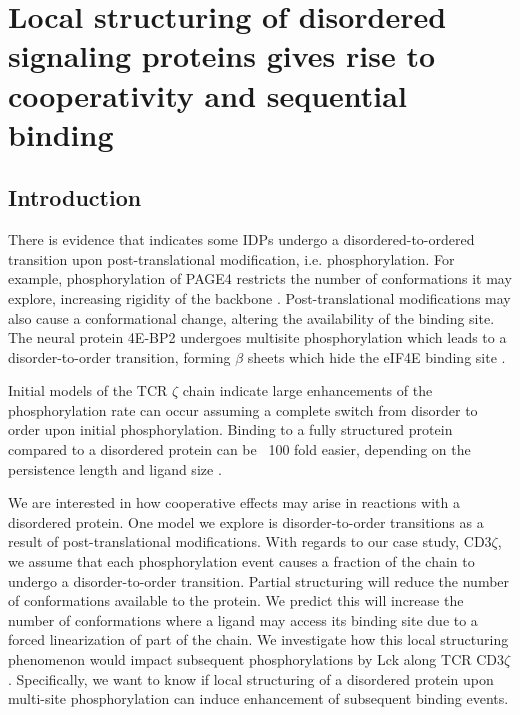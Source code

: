 \documentclass[../../AdvancementSummary.tex]{subfiles}
\begin{document}
\section{Local structuring of disordered signaling proteins gives rise to cooperativity and sequential binding}
\label{sec:LocalStruct}


\subsection{Introduction}


There is evidence that indicates some IDPs undergo a disordered-to-ordered transition upon post-translational modification, i.e. phosphorylation. For example, phosphorylation of PAGE4 restricts the number of conformations it may explore, increasing rigidity of the backbone \cite{He2015}. Post-translational modifications may also cause a conformational change, altering the availability of the binding site. The neural protein 4E-BP2 undergoes multisite phosphorylation which leads to a disorder-to-order transition, forming $\beta$ sheets which hide the eIF4E binding site \cite{Bah2015}. 

Initial models of the TCR $\zeta$ chain indicate large enhancements of the phosphorylation rate can occur assuming a complete switch from disorder to order upon initial phosphorylation. Binding to a fully structured protein compared to a disordered protein can be ~100 fold easier, depending on the persistence length and ligand size \cite{Mukhopadhyay2016}.


We are interested in how cooperative effects may arise in reactions with a disordered protein. One model we explore is disorder-to-order transitions as a result of post-translational modifications. With regards to our case study, CD3$\zeta$, we assume that each phosphorylation event causes a fraction of the chain to undergo a disorder-to-order transition. Partial structuring will reduce the number of conformations available to the protein. We predict this will increase the number of conformations where a ligand may access its binding site due to a forced linearization of part of the chain. We investigate how this local structuring phenomenon would impact subsequent phosphorylations by Lck along TCR CD3$\zeta$. Specifically, we want to know if local structuring of a disordered protein upon multi-site phosphorylation can induce enhancement of subsequent binding events.
\end{document}
